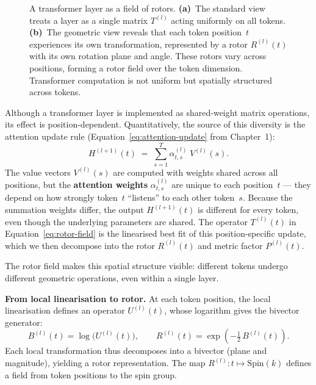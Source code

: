 \documentclass[11pt, twoside, openright]{memoir}
\numberwithin{equation}{chapter}
\begin{document}
\begin{figure}[ht]

\caption{A transformer layer as a field of rotors.
\textbf{(a)}~The standard view treats a layer as a single matrix
$T^{(l)}$ acting uniformly on all tokens.
\textbf{(b)}~The geometric view reveals that each token position~$t$
experiences its own transformation, represented by a rotor
$R^{(l)}(t)$ with its own rotation plane and angle.
These rotors vary across positions, forming a rotor field over the
token dimension.  Transformer computation is not uniform but
spatially structured across tokens.}
\label{fig:rotor-field}
\end{figure}

Although a transformer layer is implemented as shared-weight matrix
operations, its effect is position-dependent.  Quantitatively, the
source of this diversity is the attention update rule
(Equation~\eqref{eq:attention-update} from Chapter~1):
\begin{equation}
  H^{(l+1)}(t)
  \;=\;
  \sum_{s=1}^{T} \alpha_{t,s}^{(l)} \; V^{(l)}(s).
\end{equation}
The value vectors $V^{(l)}(s)$ are computed with weights shared across
all positions, but the \textbf{attention weights}
$\alpha_{t,s}^{(l)}$ are unique to each position~$t$ --- they depend
on how strongly token~$t$ ``listens'' to each other token~$s$.
Because the summation weights differ, the output $H^{(l+1)}(t)$ is
different for every token, even though the underlying parameters are
shared.  The operator $T^{(l)}(t)$ in
Equation~\eqref{eq:rotor-field} is the linearised best fit of this
position-specific update, which we then decompose into the rotor
$R^{(l)}(t)$ and metric factor $P^{(l)}(t)$.

The rotor field makes this spatial structure visible: different tokens
undergo different geometric operations, even within a single layer.

\begin{gabox}
\textbf{From local linearisation to rotor.}
At each token position, the local linearisation defines an operator
$U^{(l)}(t)$, whose logarithm gives the bivector generator:
\begin{equation}
  B^{(l)}(t) = \log\!\big(U^{(l)}(t)\big),
  \qquad
  R^{(l)}(t) = \exp\!\left(-\tfrac{1}{2}\, B^{(l)}(t)\right).
\end{equation}
Each local transformation thus decomposes into a bivector (plane and
magnitude), yielding a rotor representation.  The map
$R^{(l)} : t \mapsto \mathrm{Spin}(k)$ defines a field from token
positions to the spin group.
\end{gabox}
\end{document}
